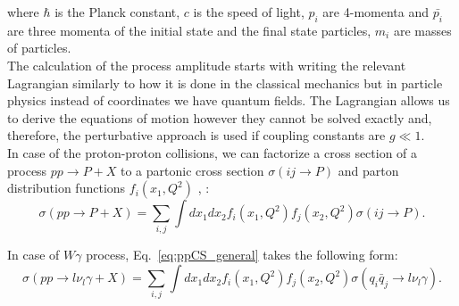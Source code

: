 where $\hbar$ is the Planck constant, $c$ is the speed of light, $p_i$ are 4-momenta and ${\bar{p_i}}$ are three momenta of the initial state and the final state particles, $m_i$ are masses of particles.\\ 

The calculation of the process amplitude starts with writing the relevant Lagrangian similarly to how it is done in the classical mechanics but in particle physics instead of coordinates we have quantum fields. The Lagrangian allows us to derive the equations of motion however they cannot be solved exactly and, therefore, the perturbative approach is used if coupling constants are $g \ll 1$.\\


In case of the proton-proton collisions, we can factorize a cross section of a process $pp \rightarrow P+X$ to a partonic cross section $\sigma(ij \rightarrow P)$ and parton distribution functions $f_i(x_1,Q^2)$ \cite{ref_PDG}, \cite{ref_Lindsey_thesis}:\\

\begin{equation}\label{eq:ppCS_general}
  \sigma(pp \rightarrow P+X)= \sum_{i,j} \int dx_1 dx_2 f_i(x_1,Q^2) f_j(x_2, Q^2) \sigma(ij \rightarrow P).
\end{equation}

In case of $W\gamma$ process, Eq.~\ref{eq:ppCS_general} takes the following form: \\

\begin{equation}\label{eq:ppCS_Wg}
  \sigma(pp \rightarrow l \nu_l \gamma + X)= \sum_{i,j} \int dx_1 dx_2 f_i(x_1,Q^2) f_j(x_2, Q^2) \sigma(q_i \bar{q}_j \rightarrow l \nu_l \gamma).
\end{equation}

